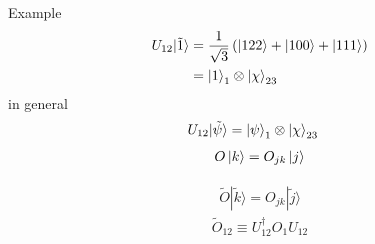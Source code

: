 \documentclass[letter,12pt]{article}
\begin{document}
Example
\begin{equation}
	\begin{aligned}
		U_{12}|\tilde 1\rangle&=\frac{1}{\sqrt{3}}\left(\ket{122}+\ket{100}+\ket{111}\right)
		\\
		&=\ket{1}_1\otimes \ket{\chi}_{23}
	\end{aligned}
\end{equation}
in general
\begin{equation}
	\begin{aligned}
		U_{12}|\tilde \psi\rangle
		&=\ket{\psi}_1\otimes \ket{\chi}_{23}
	\end{aligned}
\end{equation}
\begin{equation}
	\begin{aligned}
		O\ket{k}=O_{jk}\ket{j}
	\end{aligned}
\end{equation}

\begin{equation}
	\begin{aligned}
		\tilde{O}|\tilde k\rangle =O_{jk}|\tilde j\rangle 
	\end{aligned}
\end{equation}
\begin{equation}
	\begin{aligned}
		\tilde{O}_{12}\equiv U^\dagger_{12}O_1 U_{12}  
	\end{aligned}
\end{equation}
\end{document}
